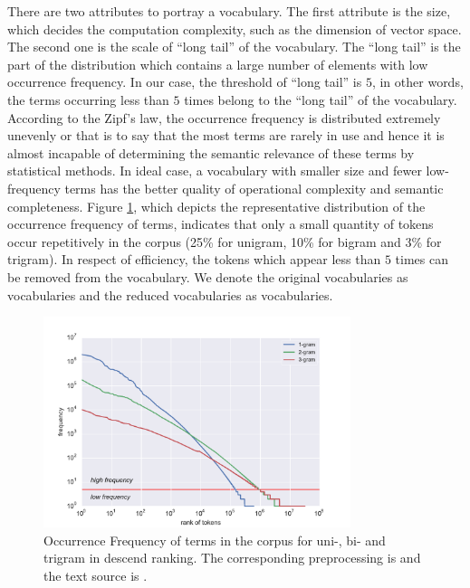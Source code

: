 There are two attributes to portray a vocabulary. The first attribute is the size, which decides the computation complexity, such as the dimension of vector space. The second one is the scale of ``long tail'' of the vocabulary. The ``long tail'' is the part of the distribution which contains a large number of elements with low occurrence frequency. In our case, the threshold of ``long tail'' is $5$, in other words, the terms occurring less than $5$ times belong to the ``long tail'' of the vocabulary. According to the Zipf's law, the occurrence frequency is distributed extremely unevenly or that is to say that the most terms are rarely in use and hence it is almost incapable of determining the semantic relevance of these terms by statistical methods. In ideal case, a vocabulary with smaller size and fewer low-frequency terms has the better quality of operational complexity and semantic completeness. Figure \ref{fig:freqdist}, which depicts the representative distribution of the occurrence frequency of terms, indicates that only a small quantity of tokens occur repetitively in the corpus (25\% for unigram, 10\% for bigram and 3\% for trigram). In respect of efficiency, the tokens which appear less than $5$ times can be removed from the vocabulary. We denote the original vocabularies as \ifull{} vocabularies and the reduced vocabularies as \icommon{} vocabularies. 

\begin{figure}[!htb]
    \centering
    \includegraphics[width=0.8\textwidth]{fig/freqdist}
    \caption{Occurrence Frequency of terms in the corpus for uni-, bi- and trigram in descend ranking. The corresponding preprocessing is \iSE{} and the text source is \icontent{}.}
    \label{fig:freqdist}
\end{figure}

